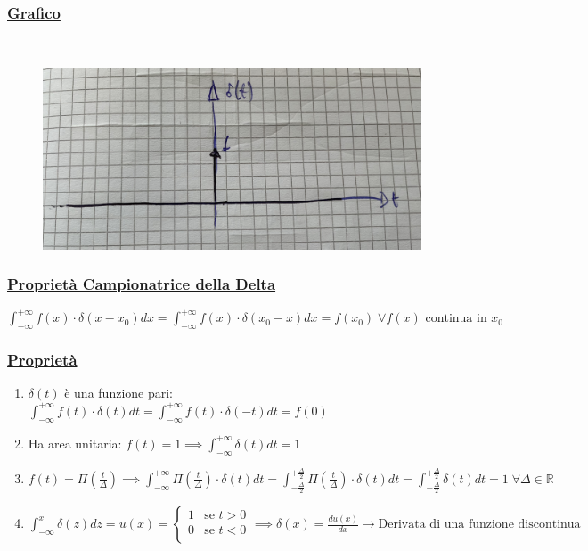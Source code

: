 \documentclass{article}
\begin{document}
\subsubsection{\underline{Grafico}} ~\\
\begin{figure}[ht]
\centering
\includegraphics[scale=0.10]{images/12.Dirac.jpeg}
\end{figure} 
\subsubsection{\underline{Proprietà Campionatrice della Delta}}
$\int_{- \infty}^{+ \infty} f(x) \cdot \delta(x - x_0) dx = \int_{- \infty}^{+ \infty} f(x) \cdot \delta(x_0 - x) dx = f(x_0) \; \forall f(x) \text{ continua in } x_0$
\subsubsection{\underline{Proprietà}}
\begin{enumerate}
    \item $\delta(t)$ è una funzione pari: $\int_{- \infty}^{+ \infty} f(t) \cdot \delta(t) dt = \int_{- \infty}^{+ \infty} f(t) \cdot \delta(-t) dt = f(0)$
    \item Ha area unitaria: $f(t) = 1 \implies \int_{- \infty}^{+ \infty} \delta(t) dt = 1$
    \item $f(t) = \Pi\left( \frac{t}{\Delta}\right) \implies \int_{- \infty}^{+ \infty} \Pi\left( \frac{t}{\Delta}\right) \cdot \delta(t) dt = \int_{- \frac{\Delta}{2}}^{+ \frac{\Delta}{2}} \Pi\left( \frac{t}{\Delta}\right) \cdot \delta(t) dt = \int_{- \frac{\Delta}{2}}^{+ \frac{\Delta}{2}} \delta(t) dt = 1 \; \forall \Delta \in \mathbb{R}$
    \item $\int_{- \infty}^{x} \delta(z) dz = u(x) =  \begin{cases} 
    1 & \text{se } t > 0 \\
    0 & \text{se } t < 0 \\
    \end{cases}
    \implies 
    \delta(x) = \frac{d u(x)}{dx} \rightarrow \text{Derivata di una funzione discontinua}$
\end{enumerate}
\newpage
\end{document}
